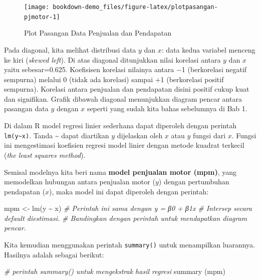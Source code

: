 \documentclass[
]{book}
\newenvironment{Shaded}{\begin{snugshade}}{\end{snugshade}}
\newcommand{\CommentTok}[1]{\textcolor[rgb]{0.56,0.35,0.01}{\textit{#1}}}
\newcommand{\FunctionTok}[1]{\textcolor[rgb]{0.00,0.00,0.00}{#1}}
\newcommand{\NormalTok}[1]{#1}
\newcommand{\OtherTok}[1]{\textcolor[rgb]{0.56,0.35,0.01}{#1}}
\newcommand{\SpecialCharTok}[1]{\textcolor[rgb]{0.00,0.00,0.00}{#1}}
\begin{document}
\begin{figure}

{\centering \texttt{[image: bookdown-demo\_files/figure-latex/plotpasangan-pjmotor-1]} 

}

\caption{Plot Pasangan Data Penjualan dan Pendapatan}\label{fig:plotpasangan-pjmotor}
\end{figure}

Pada diagonal, kita melihat distribusi data \(y\) dan \(x\): data kedua variabel menceng ke kiri (\emph{skewed left}). Di atas diagonal ditunjukkan nilai korelasi antara \(y\) dan \(x\) yaitu sebesar=0.625. Koefisisen korelasi nilainya antara −1 (berkorelasi negatif sempurna) melalui 0 (tidak ada korelasi) sampai +1 (berkorelasi positif sempurna). Korelasi antara penjualan dan pendapatan disini positif cukup kuat dan signifikan. Grafik dibawah diagonal menunjukkan diagram pencar antara pasangan data \(y\) dengan \(x\) seperti yang sudah kita bahas sebelumnya di Bab 1.

Di dalam R model regresi linier sederhana dapat diperoleh dengan perintah \texttt{lm(y\textasciitilde{}x)}. Tanda \textasciitilde{} dapat diartikan \(y\) dijelaskan oleh \(x\) atau \(y\) fungsi dari \(x\). Fungsi ini mengestimasi koefisien regresi model linier dengan metode kuadrat terkecil (\emph{the least squares method}).

Semisal modelnya kita beri nama \textbf{model penjualan motor (mpm)}, yang memodelkan hubungan antara penjualan motor (\(y\)) dengan pertumbuhan pendapatan (\(x\)), maka model ini dapat diperoleh dengan perintah:

\begin{Shaded}
\begin{Highlighting}[]
\NormalTok{mpm }\OtherTok{\textless{}{-}} \FunctionTok{lm}\NormalTok{(y }\SpecialCharTok{\textasciitilde{}}\NormalTok{ x) }
\CommentTok{\# Perintah ini sama dengan y = β0 + β1x}
\CommentTok{\# Intersep secara default diestimasi. }
\CommentTok{\# Bandingkan dengan perintah untuk mendapatkan diagram pencar. }
\end{Highlighting}
\end{Shaded}

Kita kemudian menggunakan perintah \texttt{summary()} untuk menampilkan luarannya. Hasilnya adalah sebagai berikut:

\begin{Shaded}
\begin{Highlighting}[]
\CommentTok{\# perintah summary() untuk mengekstrak hasil regresi}
\FunctionTok{summary}\NormalTok{ (mpm) }
\end{Highlighting}
\end{Shaded}
\end{document}
